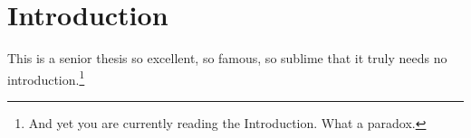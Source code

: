\chapter*{Introduction}

This is a senior thesis so excellent, so famous, so sublime
that it truly needs no introduction.\footnote{And yet you 
are currently reading the Introduction. What a paradox.} 
